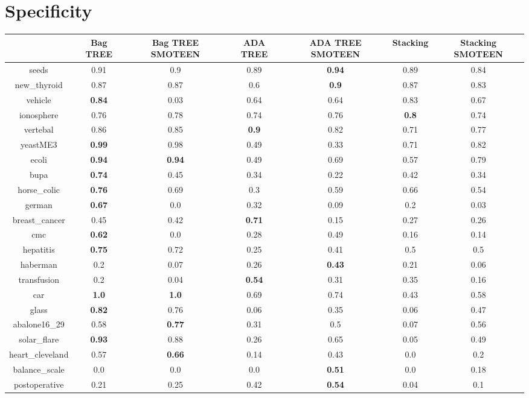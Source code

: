 \documentclass{article}%
\begin{document}
\section*{Specificity}%
\begin{tabular}{c|cccccc}%
&Bag TREE&Bag TREE SMOTEEN&ADA TREE&ADA TREE SMOTEEN&Stacking&Stacking SMOTEEN\\%
\hline%
seeds&0.91&0.9&0.89&\textbf{0.94}&0.89&0.84\\%
new\_thyroid&0.87&0.87&0.6&\textbf{0.9}&0.87&0.83\\%
vehicle&\textbf{0.84}&0.03&0.64&0.64&0.83&0.67\\%
ionosphere&0.76&0.78&0.74&0.76&\textbf{0.8}&0.74\\%
vertebal&0.86&0.85&\textbf{0.9}&0.82&0.71&0.77\\%
yeastME3&\textbf{0.99}&0.98&0.49&0.33&0.71&0.82\\%
ecoli&\textbf{0.94}&\textbf{0.94}&0.49&0.69&0.57&0.79\\%
bupa&\textbf{0.74}&0.45&0.34&0.22&0.42&0.34\\%
horse\_colic&\textbf{0.76}&0.69&0.3&0.59&0.66&0.54\\%
german&\textbf{0.67}&0.0&0.32&0.09&0.2&0.03\\%
breast\_cancer&0.45&0.42&\textbf{0.71}&0.15&0.27&0.26\\%
cmc&\textbf{0.62}&0.0&0.28&0.49&0.16&0.14\\%
hepatitis&\textbf{0.75}&0.72&0.25&0.41&0.5&0.5\\%
haberman&0.2&0.07&0.26&\textbf{0.43}&0.21&0.06\\%
transfusion&0.2&0.04&\textbf{0.54}&0.31&0.35&0.16\\%
car&\textbf{1.0}&\textbf{1.0}&0.69&0.74&0.43&0.58\\%
glass&\textbf{0.82}&0.76&0.06&0.35&0.06&0.47\\%
abalone16\_29&0.58&\textbf{0.77}&0.31&0.5&0.07&0.56\\%
solar\_flare&\textbf{0.93}&0.88&0.26&0.65&0.05&0.49\\%
heart\_cleveland&0.57&\textbf{0.66}&0.14&0.43&0.0&0.2\\%
balance\_scale&0.0&0.0&0.0&\textbf{0.51}&0.0&0.18\\%
postoperative&0.21&0.25&0.42&\textbf{0.54}&0.04&0.1\\%
\end{tabular}

%
\end{document}
